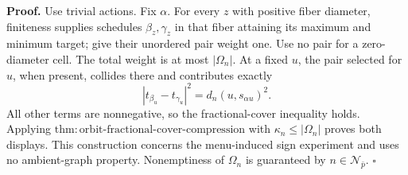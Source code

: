 \textbf{Proof.}
Use trivial actions. Fix \(\alpha\). For every \(z\) with positive fiber diameter, finiteness supplies schedules \(\beta_z,\gamma_z\) in that fiber attaining its maximum and minimum target; give their unordered pair weight one. Use no pair for a zero-diameter cell. The total weight is at most \(|\Omega_n|\). At a fixed \(u\), the pair selected for \(u\), when present, collides there and contributes exactly
\[
 |t_{\beta_u}-t_{\gamma_u}|^2=d_n(u,s_{\alpha u})^2.
\]
All other terms are nonnegative, so the fractional-cover inequality holds. Applying \(\mathrm{thm{:}orbit\text{-}fractional\text{-}cover\text{-}compression}\) with \(\kappa_n\le|\Omega_n|\) proves both displays. This construction concerns the menu-induced sign experiment and uses no ambient-graph property. Nonemptiness of \(\Omega_n\) is guaranteed by \(n\in\mathcal N_{\bar p}\). \(\square\)